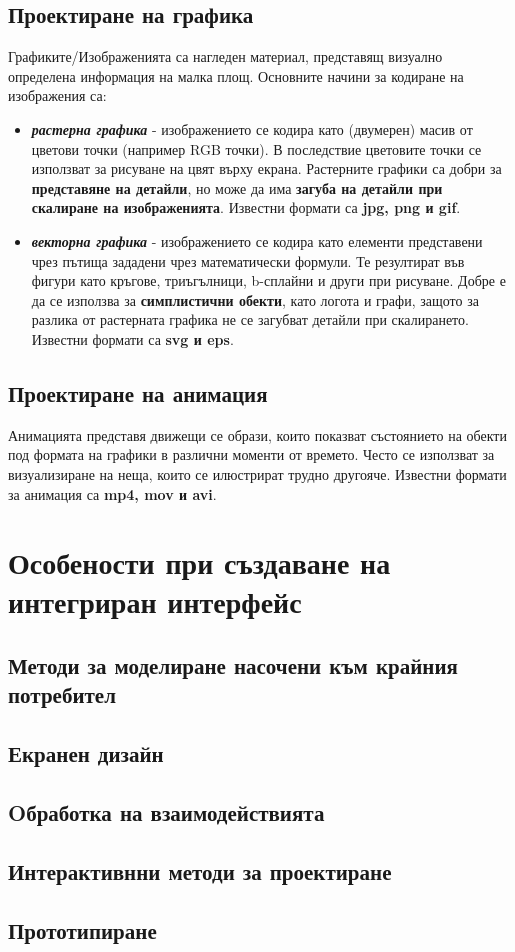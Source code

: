 \documentclass[fleqn,12pt]{article}
\begin{document}
\subsection{Проектиране на графика}

Графиките/Изображенията са нагледен материал, представящ визуално определена информация на малка площ. Основните начини за кодиране на изображения са:
\begin{itemize}
    \item \textbf{\textit{растерна графика}} - изображението се кодира като (двумерен) масив от цветови точки (например RGB точки).
    В последствие цветовите точки се използват за рисуване на цвят върху екрана.
    Растерните графики са добри за \textbf{представяне на детайли}, но може да има \textbf{загуба на детайли при скалиране на изображенията}.
    Известни формати са \textbf{jpg, png и gif}.
    \item \textbf{\textit{векторна графика}} - изображението се кодира като елементи представени чрез пътища зададени чрез математически формули.
    Те резултират във фигури като кръгове, триъгълници, b-сплайни и други при рисуване.
    Добре е да се използва за \textbf{симплистични обекти}, като логота и графи, защото за разлика от растерната графика не се загубват детайли при скалирането.
    Известни формати са \textbf{svg и eps}.
\end{itemize}

\subsection{Проектиране на анимация}

Анимацията представя движещи се образи, които показват състоянието на обекти под формата на графики в различни моменти от времето.
Често се използват за визуализиране на неща, които се илюстрират трудно другояче.
Известни формати за анимация са \textbf{mp4, mov и avi}.

\section{Особености при създаване на интегриран интерфейс}

\subsection{Методи за моделиране насочени  към  крайния  потребител}
\subsection{Екранен  дизайн}
\subsection{Oбработка  на взаимодействията}
\subsection{Интерактивнни методи за проектиране}
\subsection{Прототипиране}
\end{document}
